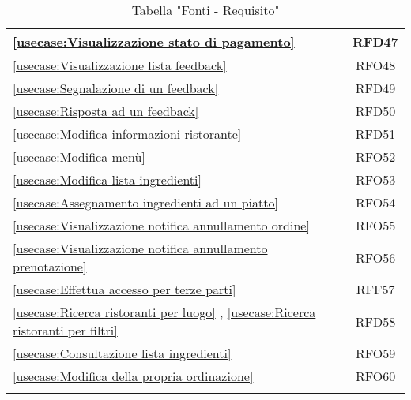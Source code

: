 \begin{longtable}{|l|c|}
	\hline
	\autoref{usecase:Visualizzazione stato di pagamento}                                                                                                         & RFD47                  \\
	\hline
	\autoref{usecase:Visualizzazione lista feedback}                                                                                                             & RFO48                  \\
	\hline
	\autoref{usecase:Segnalazione di un feedback}                                                                                                                & RFD49                  \\
	\hline
	\autoref{usecase:Risposta ad un feedback}                                                                                                                    & RFD50                  \\
	\hline
	\autoref{usecase:Modifica informazioni ristorante}                                                                                                           & RFD51                  \\
	\hline
	\autoref{usecase:Modifica menù}                                                                                                                              & RFO52                  \\
	\hline
	\autoref{usecase:Modifica lista ingredienti}                                                                                                                 & RFO53                  \\
	\hline
	\autoref{usecase:Assegnamento ingredienti ad un piatto}                                                                                                      & RFO54                  \\
	\hline
	\autoref{usecase:Visualizzazione notifica annullamento ordine}                                                                                               & RFO55                  \\
	\hline
	\autoref{usecase:Visualizzazione notifica annullamento prenotazione}                                                                                         & RFO56				\\
	\hline
	\autoref{usecase:Effettua accesso per terze parti} 																											&RFF57                  \\
	\hline
	\autoref{usecase:Ricerca ristoranti per luogo} , \autoref{usecase:Ricerca ristoranti per filtri}															&RFD58                  \\
	\hline
	\autoref{usecase:Consultazione lista ingredienti} 																											&RFO59                  \\
	\hline
	\autoref{usecase:Modifica della propria ordinazione}																										&RFO60                  \\
	\caption{Tabella "Fonti - Requisito"}
\end{longtable}



